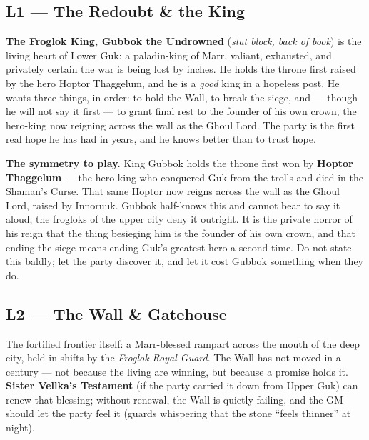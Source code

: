 \documentclass[10pt,twoside]{report}
\begin{document}
\subsection*{L1 --- The Redoubt \& the King}
\textbf{The Froglok King, Gubbok the Undrowned} (\emph{stat block, back of book}) is the living heart of Lower Guk: a paladin-king of Marr, valiant, exhausted, and privately certain the war is being lost by inches. He holds the throne first raised by the hero Hoptor Thaggelum, and he is a \emph{good} king in a hopeless post. He wants three things, in order: to hold the Wall, to break the siege, and --- though he will not say it first --- to grant final rest to the founder of his own crown, the hero-king now reigning across the wall as the Ghoul Lord. The party is the first real hope he has had in years, and he knows better than to trust hope.

\begin{gmnote}
\textbf{The symmetry to play.} King Gubbok holds the throne first won by \textbf{Hoptor Thaggelum} --- the hero-king who conquered Guk from the trolls and died in the Shaman's Curse. That same Hoptor now reigns across the wall as the Ghoul Lord, raised by Innoruuk. Gubbok half-knows this and cannot bear to say it aloud; the frogloks of the upper city deny it outright. It is the private horror of his reign that the thing besieging him is the founder of his own crown, and that ending the siege means ending Guk's greatest hero a second time. Do not state this baldly; let the party discover it, and let it cost Gubbok something when they do.
\end{gmnote}

\subsection*{L2 --- The Wall \& Gatehouse}
The fortified frontier itself: a Marr-blessed rampart across the mouth of the deep city, held in shifts by the \emph{Froglok Royal Guard}. The Wall has not moved in a century --- not because the living are winning, but because a promise holds it. \textbf{Sister Vellka's Testament} (if the party carried it down from Upper Guk) can renew that blessing; without renewal, the Wall is quietly failing, and the GM should let the party feel it (guards whispering that the stone ``feels thinner'' at night).
\end{document}
